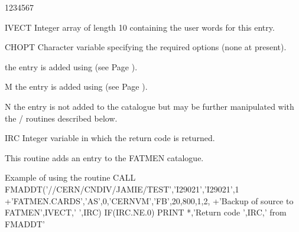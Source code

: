\begin{DLtt}{1234567}
\item[IVECT]
Integer array of length 10 containing the user words for this entry.
\item[CHOPT]
Character variable specifying the required options (none at present).
\begin{DLtt}{12}
\item[ ]the entry is added using  (see Page \pageref{FMPUT}).
\item[M]the entry is added using  (see Page \pageref{FMMOD}).
\item[N]the entry is not added to the catalogue but may
be further manipulated with the / routines described below.
\end{DLtt}
\item[IRC]
Integer variable in which the return code is returned.
\end{DLtt}
\par
This routine adds an entry to the FATMEN catalogue.
\begin{XMPt}{Example of using the \protect{} routine}
      CALL FMADDT('//CERN/CNDIV/JAMIE/TEST','I29021','I29021',1
     +'FATMEN.CARDS','AS',0,'CERNVM','FB',20,800,1,2,
     +'Backup of source to FATMEN',IVECT,' ',IRC)
      IF(IRC.NE.0) PRINT *,'Return code ',IRC,' from FMADDT'
\end{XMPt}
